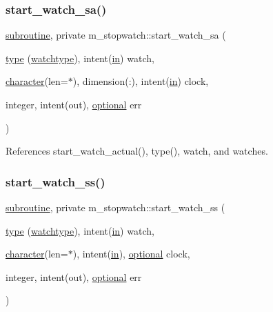 \subsubsection{\texorpdfstring{start\+\_\+watch\+\_\+sa()}{start\_watch\_sa()}}
{\footnotesize\ttfamily \hyperlink{M__stopwatch_83_8txt_acfbcff50169d691ff02d4a123ed70482}{subroutine}, private m\+\_\+stopwatch\+::start\+\_\+watch\+\_\+sa (\begin{DoxyParamCaption}\item[{\hyperlink{stop__watch_83_8txt_a70f0ead91c32e25323c03265aa302c1c}{type} (\hyperlink{structm__stopwatch_1_1watchtype}{watchtype}), intent(\hyperlink{M__journal_83_8txt_afce72651d1eed785a2132bee863b2f38}{in})}]{watch,  }\item[{\hyperlink{option__stopwatch_83_8txt_abd4b21fbbd175834027b5224bfe97e66}{character}(len=$\ast$), dimension(\+:), intent(\hyperlink{M__journal_83_8txt_afce72651d1eed785a2132bee863b2f38}{in})}]{clock,  }\item[{integer, intent(out), \hyperlink{option__stopwatch_83_8txt_aa4ece75e7acf58a4843f70fe18c3ade5}{optional}}]{err }\end{DoxyParamCaption})\hspace{0.3cm}{\ttfamily [private]}}



References start\+\_\+watch\+\_\+actual(), type(), watch, and watches.

\mbox{\label{namespacem__stopwatch_a8be3c59cc9a0333ebe966ae718d1d856}} 
\subsubsection{\texorpdfstring{start\+\_\+watch\+\_\+ss()}{start\_watch\_ss()}}
{\footnotesize\ttfamily \hyperlink{M__stopwatch_83_8txt_acfbcff50169d691ff02d4a123ed70482}{subroutine}, private m\+\_\+stopwatch\+::start\+\_\+watch\+\_\+ss (\begin{DoxyParamCaption}\item[{\hyperlink{stop__watch_83_8txt_a70f0ead91c32e25323c03265aa302c1c}{type} (\hyperlink{structm__stopwatch_1_1watchtype}{watchtype}), intent(\hyperlink{M__journal_83_8txt_afce72651d1eed785a2132bee863b2f38}{in})}]{watch,  }\item[{\hyperlink{option__stopwatch_83_8txt_abd4b21fbbd175834027b5224bfe97e66}{character}(len=$\ast$), intent(\hyperlink{M__journal_83_8txt_afce72651d1eed785a2132bee863b2f38}{in}), \hyperlink{option__stopwatch_83_8txt_aa4ece75e7acf58a4843f70fe18c3ade5}{optional}}]{clock,  }\item[{integer, intent(out), \hyperlink{option__stopwatch_83_8txt_aa4ece75e7acf58a4843f70fe18c3ade5}{optional}}]{err }\end{DoxyParamCaption})\hspace{0.3cm}{\ttfamily [private]}}



